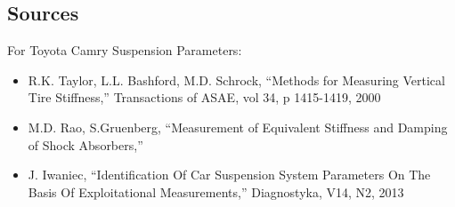 \subsection{Sources}
For Toyota Camry Suspension Parameters:
\begin{itemize}
    \item R.K. Taylor, L.L. Bashford, M.D. Schrock, ``Methods for Measuring Vertical Tire Stiffness,''
    Transactions of ASAE, vol 34, p 1415-1419, 2000
    \item M.D. Rao, S.Gruenberg, ``Measurement of Equivalent Stiffness and Damping of Shock Absorbers,''
    \item J. Iwaniec, ``Identification Of Car Suspension System Parameters On The Basis Of Exploitational Measurements,'' Diagnostyka, V14, N2, 2013
\end{itemize}

